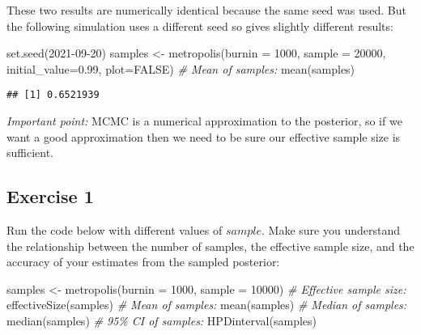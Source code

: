 \documentclass[
  12pt,
]{article}
\newenvironment{Shaded}{\begin{snugshade}}{\end{snugshade}}
\newcommand{\AttributeTok}[1]{\textcolor[rgb]{0.77,0.63,0.00}{#1}}
\newcommand{\CommentTok}[1]{\textcolor[rgb]{0.56,0.35,0.01}{\textit{#1}}}
\newcommand{\ConstantTok}[1]{\textcolor[rgb]{0.00,0.00,0.00}{#1}}
\newcommand{\DecValTok}[1]{\textcolor[rgb]{0.00,0.00,0.81}{#1}}
\newcommand{\FloatTok}[1]{\textcolor[rgb]{0.00,0.00,0.81}{#1}}
\newcommand{\FunctionTok}[1]{\textcolor[rgb]{0.00,0.00,0.00}{#1}}
\newcommand{\NormalTok}[1]{#1}
\newcommand{\OtherTok}[1]{\textcolor[rgb]{0.56,0.35,0.01}{#1}}
\begin{document}
These two results are numerically identical because the same seed was
used. But the following simulation uses a different seed so gives
slightly different results:

\begin{Shaded}
\begin{Highlighting}[]
\FunctionTok{set.seed}\NormalTok{(}\DecValTok{2021{-}09{-}20}\NormalTok{)}
\NormalTok{samples }\OtherTok{\textless{}{-}} \FunctionTok{metropolis}\NormalTok{(}\AttributeTok{burnin =} \DecValTok{1000}\NormalTok{, }\AttributeTok{sample =} \DecValTok{20000}\NormalTok{,}
                      \AttributeTok{initial\_value=}\FloatTok{0.99}\NormalTok{, }\AttributeTok{plot=}\ConstantTok{FALSE}\NormalTok{)}
\CommentTok{\# Mean of samples:}
\FunctionTok{mean}\NormalTok{(samples)}
\end{Highlighting}
\end{Shaded}

\begin{verbatim}
## [1] 0.6521939
\end{verbatim}

\emph{Important point:} MCMC is a numerical approximation to the
posterior, so if we want a good approximation then we need to be sure
our effective sample size is sufficient.

\hypertarget{exercise-1}{%
\subsection{Exercise 1}\label{exercise-1}}

Run the code below with different values of \(sample\). Make sure you
understand the relationship between the number of samples, the effective
sample size, and the accuracy of your estimates from the sampled
posterior:

\begin{Shaded}
\begin{Highlighting}[]
\NormalTok{samples }\OtherTok{\textless{}{-}} \FunctionTok{metropolis}\NormalTok{(}\AttributeTok{burnin =} \DecValTok{1000}\NormalTok{, }\AttributeTok{sample =} \DecValTok{10000}\NormalTok{)}
\CommentTok{\# Effective sample size:}
\FunctionTok{effectiveSize}\NormalTok{(samples)}
\CommentTok{\# Mean of samples:}
\FunctionTok{mean}\NormalTok{(samples)}
\CommentTok{\# Median of samples:}
\FunctionTok{median}\NormalTok{(samples)}
\CommentTok{\# 95\% CI of samples:}
\FunctionTok{HPDinterval}\NormalTok{(samples)}
\end{Highlighting}
\end{Shaded}
\end{document}
